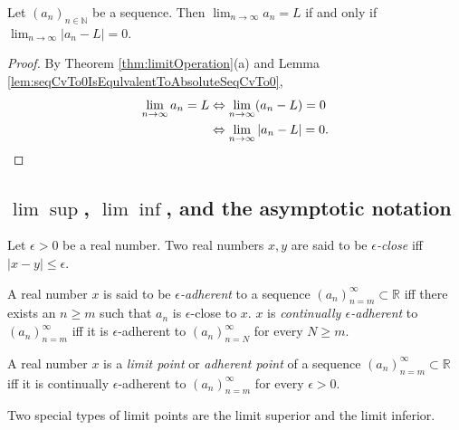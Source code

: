 \begin{coro}
  \label{coro:seqToLIsEquvalentToAbsOfSeqMinusLTo0}
  Let $(a_{n})_{n\in \mathbb{N}}$ be a sequence. Then
  $\lim_{n\rightarrow\infty}a_{n}=L$ if and only if
  $\lim_{n\rightarrow\infty}|a_{n}-L|=0$.
\end{coro}
\begin{proof}
  By Theorem \ref{thm:limitOperation}(a) and Lemma
  \ref{lem:seqCvTo0IsEqulvalentToAbsoluteSeqCvTo0},
  \begin{align*}
    \lim_{n\rightarrow\infty}a_{n}=L
    &\Leftrightarrow
      \lim_{n\rightarrow\infty}(a_{n}-L)=0\\
    &\Leftrightarrow
      \lim_{n\rightarrow\infty}|a_{n}-L|=0.\qedhere
  \end{align*}
\end{proof}

\subsection{$\lim\sup$, $\lim\inf$, and
  the asymptotic notation}
\label{sec:limSupLimInfAsympNotatation}


\begin{defn}
  Let $\epsilon>0$ be a real number.
  Two real numbers $x,y$ are said to be \emph{$\epsilon$-close}
  iff $|x-y|\le \epsilon$.
\end{defn}

\begin{defn}
  A real number $x$ is said to be \emph{$\epsilon$-adherent}
  to a sequence $(a_n)_{n=m}^{\infty}\subset \mathbb{R}$
  iff there exists an $n\ge m$ such that
  $a_n$ is $\epsilon$-close to $x$.
  $x$ is \emph{continually $\epsilon$-adherent} to
  $(a_n)_{n=m}^{\infty}$
  iff it is $\epsilon$-adherent to $(a_n)_{n=N}^{\infty}$
  for every $N\ge m$.
\end{defn}

\begin{defn}
  \label{def:limitPointInR}
  A real number $x$ is a \emph{limit point} or \emph{adherent point}
  of a sequence $(a_n)_{n=m}^{\infty}\subset \mathbb{R}$ 
  iff it is continually $\epsilon$-adherent to
  $(a_n)_{n=m}^{\infty}$ for every $\epsilon> 0$.
\end{defn}

\begin{rem}
  Two special types of limit points are the limit superior
  and the limit inferior.
\end{rem}

